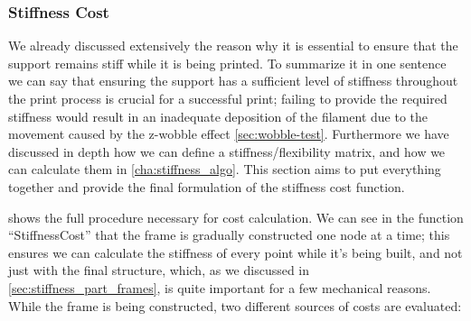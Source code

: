 \subsubsection{Stiffness Cost}

We already discussed extensively the reason why it is essential to ensure that the support
remains stiff while it is being printed. To summarize it in one sentence we can say that ensuring
the support has a sufficient level of stiffness throughout the print process is crucial for
a successful print; failing to provide the required stiffness would result in an inadequate
deposition of the filament due to the movement caused 
by the z-wobble effect \cref{sec:wobble-test}.
Furthermore we have discussed in depth how we can define a stiffness/flexibility matrix,
and how we can calculate them in \cref{cha:stiffness_algo}.
This section aims to put everything together and provide the final formulation of the stiffness
cost function.

 shows the full procedure necessary
for cost calculation. We can see in the function ``StiffnessCost'' that the frame is gradually
constructed one node at a time; this ensures we can calculate the stiffness of every point
while it's being built, and not just with the final structure, which, as we discussed in
\cref{sec:stiffness_part_frames}, is quite important for a few mechanical reasons.
While the frame is being constructed, two different sources of costs are evaluated:

